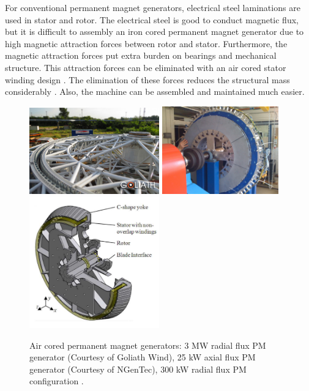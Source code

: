 \documentclass[a4paper, 11pt]{article} %
\begin{document}
For conventional permanent magnet generators, electrical steel laminations are used in stator and rotor. The electrical steel is good to conduct magnetic flux, but it is difficult to assembly an iron cored permanent magnet generator due to high magnetic attraction forces between rotor and stator. Furthermore, the magnetic attraction forces put extra burden on bearings and mechanical structure. This attraction forces can be eliminated with an air cored stator winding design \cite{Mueller2009}. The elimination of these forces reduces the structural mass considerably \cite{McDonald2008b}. Also, the machine can be assembled and maintained much easier. 


  \begin{figure}[t]
    \centering
    \includegraphics[width=0.5\textwidth]{goliath}
    \includegraphics[width=0.45\textwidth]{25kw_cgen}
    \includegraphics[width=0.5\textwidth]{c-core_kamper}
    \caption{Air cored permanent magnet generators: 3 MW radial flux PM generator (Courtesy of Goliath Wind), 25 kW axial flux PM generator (Courtesy of NGenTec), 300 kW radial flux PM configuration \cite{Wijk2010}.} 
    \label{air_cored}
  \end{figure}
\end{document}
